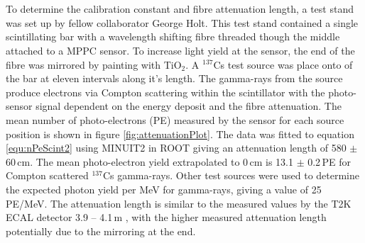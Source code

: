 \\\\To determine the calibration constant and fibre attenuation length, a test stand was set up by fellow collaborator George Holt. This test stand contained a single scintillating bar with a wavelength shifting fibre threaded though the middle attached to a MPPC sensor. To increase light yield at the sensor, the end of the fibre was mirrored by painting with TiO$_2$. A $^{137}$Cs test source was place onto of the bar at eleven intervals along it's length. The gamma-rays from the source produce electrons via Compton scattering within the scintillator with the photo-sensor signal dependent on the energy deposit and the fibre attenuation. The mean number of photo-electrons (PE) measured by the sensor for each source position is shown in figure \ref{fig:attenuationPlot}. The data was fitted to equation \ref{equ:nPeScint2} using MINUIT2 in ROOT\cite{ROOT_Brun_1997} giving an attenuation length of 580 $\pm$ 60\,cm. The mean photo-electron  yield extrapolated to 0\,cm is 13.1 $\pm$ 0.2\,PE for Compton scattered $^{137}$Cs gamma-rays. Other test sources were used to determine the expected photon yield per MeV for gamma-rays, giving a value of 25\,PE/MeV. The attenuation length is similar to the measured values by the T2K ECAL detector 3.9 -- 4.1\,m \cite{Allan_2013}, with the higher measured attenuation length potentially due to the mirroring at the end.


